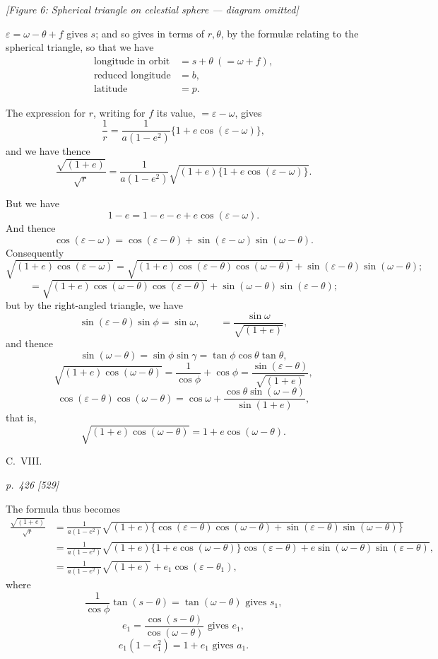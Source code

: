 \documentclass[11pt,a4paper]{article}
\theoremstyle{plain}
\theoremstyle{definition}
\begin{document}
\begin{center}
\textit{[Figure 6: Spherical triangle on celestial sphere --- diagram omitted]}
\end{center}

\noindent
$\varepsilon = \omega - \theta + f$ gives $s$; and so gives in terms of $r, \theta$, by the formul\ae{} relating
to the spherical triangle, so that we have
\begin{align*}
\text{longitude in orbit} &= s + \theta\ (= \omega + f),\\
\text{reduced longitude} &= b,\\
\text{latitude} &= p.
\end{align*}

The expression for $r$, writing for $f$ its value, $= \varepsilon - \omega$, gives
\[
\frac{1}{r} = \frac{1}{a(1 - e^2)}\{1 + e\cos(\varepsilon - \omega)\},
\]
and we have thence
\[
\frac{\sqrt{(1 + e)}}{\sqrt{r}} = \frac{1}{a(1 - e^2)}\sqrt{(1 + e)\{1 + e\cos(\varepsilon - \omega)\}}.
\]

But we have
\[
1 - e = 1 - e - e + e\cos(\varepsilon - \omega).
\]
And thence
\[
\cos(\varepsilon - \omega) = \cos(\varepsilon - \theta) + \sin(\varepsilon - \omega)\sin(\omega - \theta).
\]
Consequently
\[
\sqrt{(1 + e)\cos(\varepsilon - \omega)} = \sqrt{(1 + e)\cos(\varepsilon - \theta)\cos(\omega - \theta)} + \sin(\varepsilon - \theta)\sin(\omega - \theta);
\]
\[
= \sqrt{(1 + e)\cos(\omega - \theta)\cos(\varepsilon - \theta)} + \sin(\omega - \theta)\sin(\varepsilon - \theta);
\]
but by the right-angled triangle, we have
\[
\sin(\varepsilon - \theta)\sin\phi = \sin\omega, \qquad = \frac{\sin\omega}{\sqrt{(1 + e)}},
\]
and thence
\[
\sin(\omega - \theta) = \sin\phi\sin\gamma = \tan\phi\cos\theta\tan\theta,
\]
\[
\sqrt{(1 + e)\cos(\omega - \theta)} = \frac{1}{\cos\phi} + \cos\phi = \frac{\sin(\varepsilon - \theta)}{\sqrt{(1 + e)}},
\]
\[
\cos(\varepsilon - \theta)\cos(\omega - \theta) = \cos\omega + \frac{\cos\theta\sin(\omega - \theta)}{\sin(1 + e)},
\]
that is,
\[
\sqrt{(1 + e)\cos(\omega - \theta)} = 1 + e\cos(\omega - \theta).
\]

\bigskip
\hfill{\small C.\ VIII.}

\clearpage

\bigskip
\textit{p.~426 [529]}
\smallskip

The formula thus becomes
\begin{align*}
\frac{\sqrt{(1 + e)}}{\sqrt{r}} &= \frac{1}{a(1 - e^2)}\sqrt{(1 + e)\{\cos(\varepsilon - \theta)\cos(\omega - \theta) + \sin(\varepsilon - \theta)\sin(\omega - \theta)\}}\\
&= \frac{1}{a(1 - e^2)}\sqrt{(1 + e)\{1 + e\cos(\omega - \theta)\}\cos(\varepsilon - \theta) + e\sin(\omega - \theta)\sin(\varepsilon - \theta)},\\
&= \frac{1}{a(1 - e^2)}\sqrt{(1 + e)} + e_1\cos(\varepsilon - \theta_1),
\end{align*}
where
\[
\frac{1}{\cos\phi}\tan(s - \theta) = \tan(\omega - \theta)\text{ gives } s_1,
\]
\[
e_1 = \frac{\cos(s - \theta)}{\cos(\omega - \theta)}\text{ gives } e_1,
\]
\[
e_1(1 - e_1^2) = 1 + e_1\text{ gives } a_1.
\]
\end{document}
